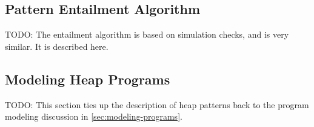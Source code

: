 \subsection{Pattern Entailment Algorithm}
\label{sec:entailment-algorithm}

TODO: The entailment algorithm is based on simulation checks, and is very similar. It is described here.

\subsection{Modeling Heap Programs}
\label{sec:modeling-heap-programs}

TODO: This section ties up the description of heap patterns back to the program modeling discussion in \autoref{sec:modeling-programs}.